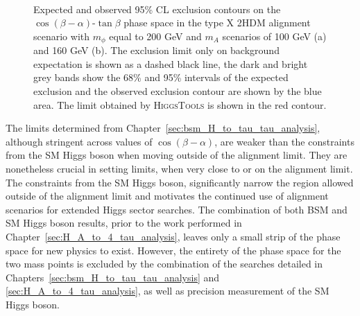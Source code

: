 \begin{figure}[!hbtp]
\centering
     \\
\caption{Expected and observed 95\% CL exclusion contours on the $\cos(\beta-\alpha)$-$\tan\beta$ phase space in the type X 2HDM alignment scenario with $m_{\phi}$ equal to 200 GeV and $m_{A}$ scenarios of 100 GeV (a) and 160 GeV (b). The exclusion limit only on background expectation is shown as a dashed black line, the dark and bright grey bands show the 68\% and 95\% intervals of the expected exclusion and the observed exclusion contour are shown by the blue area. The limit obtained by \textsc{HiggsTools} is shown in the red contour.}
\label{fig:4tau_cosbma_hb}
\end{figure}

The limits determined from Chapter~\ref{sec:bsm_H_to_tau_tau_analysis}, although stringent across values of $\cos(\beta-\alpha)$, are weaker than the constraints from the \ac{SM} Higgs boson when moving outside of the alignment limit.
They are nonetheless crucial in setting limits, when very close to or on the alignment limit.
The constraints from the \ac{SM} Higgs boson, significantly narrow the region allowed outside of the alignment limit and motivates the continued use of alignment scenarios for extended Higgs sector searches.
The combination of both \ac{BSM} and \ac{SM} Higgs boson results, prior to the work performed in Chapter~\ref{sec:H_A_to_4_tau_analysis}, leaves only a small strip of the phase space for new physics to exist.
However, the entirety of the phase space for the two mass points is excluded by the combination of the searches detailed in Chapters~\ref{sec:bsm_H_to_tau_tau_analysis} and \ref{sec:H_A_to_4_tau_analysis}, as well as precision measurement of the \ac{SM} Higgs boson.

